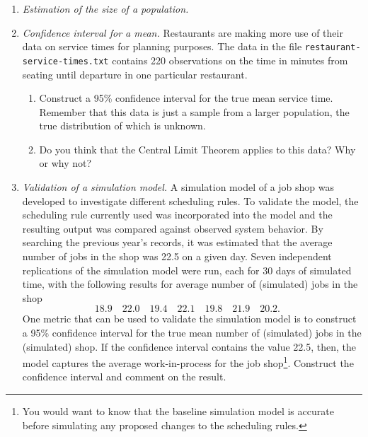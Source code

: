 \begin{enumerate}
\item \emph{Estimation of the size of a population.}


\item \emph{Confidence interval for a mean.} Restaurants are making
  more use of their data on service times for planning purposes.  The
  data in the file \texttt{restaurant-service-times.txt} contains 220
  observations on the time in minutes from seating until departure in
  one particular restaurant. 
\begin{enumerate}
\item Construct a 95\% confidence interval for the true mean service
  time. Remember that this data is just a sample from a larger
  population, the true distribution of which is unknown.
\item Do you think that the Central Limit Theorem applies to this
  data? Why or why not?
\end{enumerate}

\item \emph{Validation of a simulation model.} A simulation model of a
  job shop was developed to investigate different scheduling rules. To
  validate the model, the scheduling rule currently used was
  incorporated into the model and the resulting output was compared
  against observed system behavior. By searching the previous year’s
  records, it was estimated that the average number of jobs in the
  shop was 22.5 on a given day. Seven independent replications of the
  simulation model were run, each for 30 days of simulated time, with the
  following results for average number of (simulated) jobs in the shop
\[
18.9 \quad
22.0 \quad
19.4 \quad
22.1 \quad
19.8 \quad 
21.9 \quad
20.2.\quad
\]
One metric that can be used to validate the simulation model is to
construct a 95\% confidence interval for the true mean number of
(simulated) jobs in the (simulated) shop. If the confidence interval
contains the value 22.5, then, the model captures the average
work-in-process for the job shop\footnote{You would want to know that the
baseline simulation model is accurate before simulating any proposed
changes to the scheduling rules.}. Construct the confidence interval
and comment on the result.


\end{enumerate}
